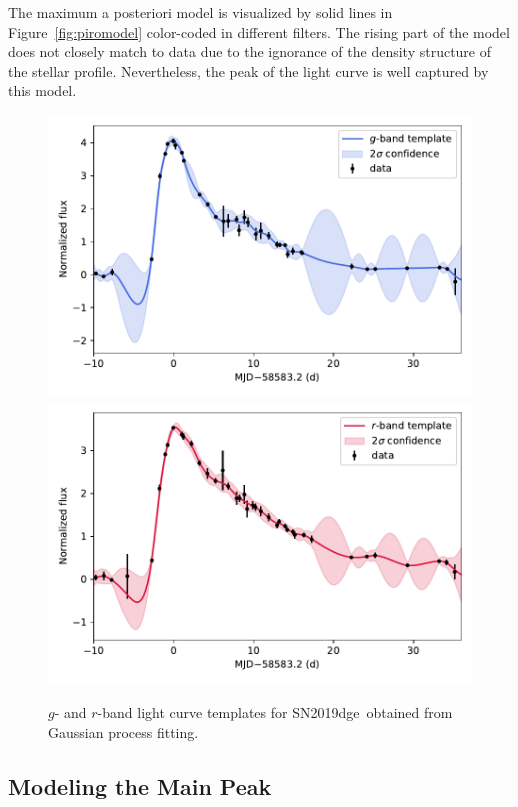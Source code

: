 \documentclass[twocolumn]{aastex63}
\newcommand{\name}{SN2019dge}
\begin{document}
\begin{CJK*}{UTF8}{gbsn}
The maximum a posteriori model is visualized by solid lines in Figure~\ref{fig:piromodel} color-coded in 
different filters. The rising part of the model does not closely match to data due to the ignorance of 
the density structure of the stellar profile. Nevertheless, the peak of the light curve is well captured by 
this model.

\begin{figure}[htbp!]
	\centering
	\includegraphics[width=\columnwidth]{figures/template_g.pdf}
	\includegraphics[width=\columnwidth]{figures/template_r.pdf}
	\caption{$g$- and $r$-band light curve templates for \name\ obtained from Gaussian process 
	fitting. 	\label{fig:template}}
\end{figure}

\subsection{Modeling the Main Peak}\label{subsec:arnettfit}


\end{CJK*}
\end{document}
